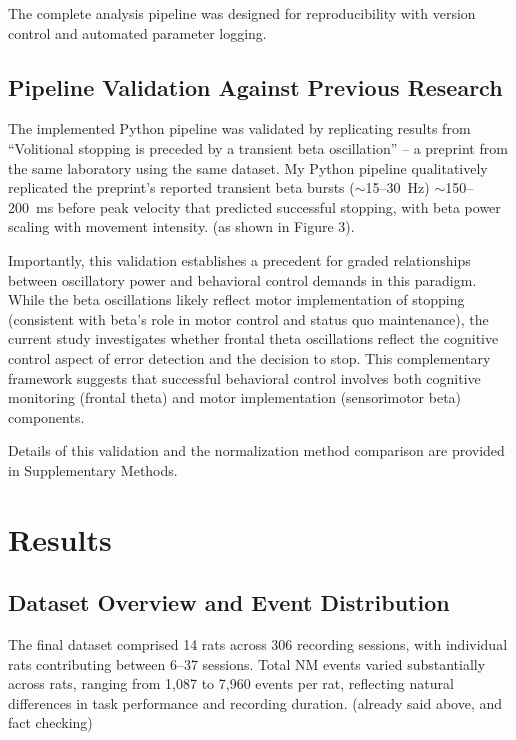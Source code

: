 \documentclass[11pt]{article}
\begin{document}
The complete analysis pipeline was designed for reproducibility with version control and automated parameter logging.

\subsection{Pipeline Validation Against Previous Research}

The implemented Python pipeline was validated by replicating results from ``Volitional stopping is preceded by a transient beta oscillation'' \citep{doutel2024volitional} -- a preprint from the same laboratory using the same dataset. My Python pipeline qualitatively replicated the preprint's reported transient beta bursts ($\sim$15--30~Hz) $\sim$150--200~ms before peak velocity that predicted successful stopping, with beta power scaling with movement intensity. (as shown in Figure 3).

Importantly, this validation establishes a precedent for graded relationships between oscillatory power and behavioral control demands in this paradigm. While the beta oscillations likely reflect motor implementation of stopping (consistent with beta's role in motor control and status quo maintenance), the current study investigates whether frontal theta oscillations reflect the cognitive control aspect of error detection and the decision to stop. This complementary framework suggests that successful behavioral control involves both cognitive monitoring (frontal theta) and motor implementation (sensorimotor beta) components.

Details of this validation and the normalization method comparison are provided in Supplementary Methods.

\section{Results}

\subsection{Dataset Overview and Event Distribution}

The final dataset comprised 14 rats across 306 recording sessions, with individual rats contributing between 6--37 sessions. Total NM events varied substantially across rats, ranging from 1,087 to 7,960 events per rat, reflecting natural differences in task performance and recording duration. (already said above, and fact checking)
\end{document}
